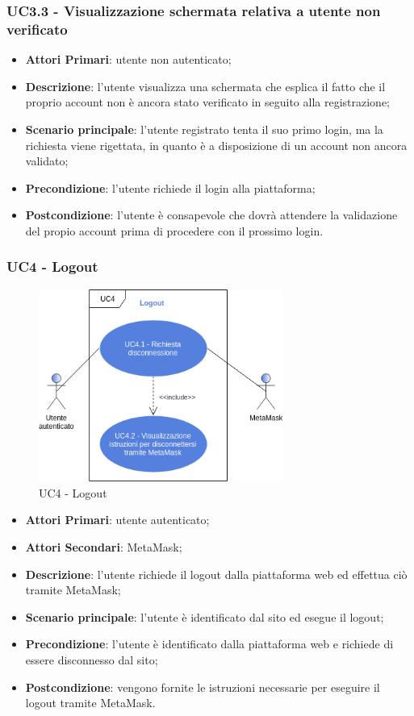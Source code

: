 \subsubsection{UC3.3 - Visualizzazione schermata relativa a utente non verificato}
\begin{itemize}
	\item \textbf{Attori Primari}:
	utente non autenticato;
	\item \textbf{Descrizione}:
	l'utente visualizza una schermata che esplica il fatto che il proprio account non è ancora stato verificato in seguito alla registrazione;
	\item \textbf{Scenario principale}:
	l'utente registrato tenta il suo primo login, ma la richiesta viene rigettata, in quanto è a disposizione di un account non ancora validato;
	\item \textbf{Precondizione}:
	l'utente richiede il login alla piattaforma;
	\item \textbf{Postcondizione}: l'utente è consapevole che dovrà attendere la validazione del propio account prima di procedere con il prossimo login.
\end{itemize}
\subsubsection{UC4 - Logout}
\begin{figure}[h]
	\includegraphics[width=8cm]{res/images/UC4Logout.png} %
	\centering
	\caption{UC4 - Logout}
	
\end{figure}
\begin{itemize}
	\item \textbf{Attori Primari}:
	utente autenticato;
	\item \textbf{Attori Secondari}:
	MetaMask\glo;
	\item \textbf{Descrizione}: l'utente richiede il logout dalla piattaforma web ed effettua ciò tramite MetaMask\glo;
	\item \textbf{Scenario principale}: l'utente è identificato dal sito ed esegue il logout;
	\item \textbf{Precondizione}: l'utente è identificato dalla piattaforma web e richiede di essere disconnesso dal sito;
	\item \textbf{Postcondizione}: vengono fornite le istruzioni necessarie per eseguire il logout tramite MetaMask\glo. 
\end{itemize}
